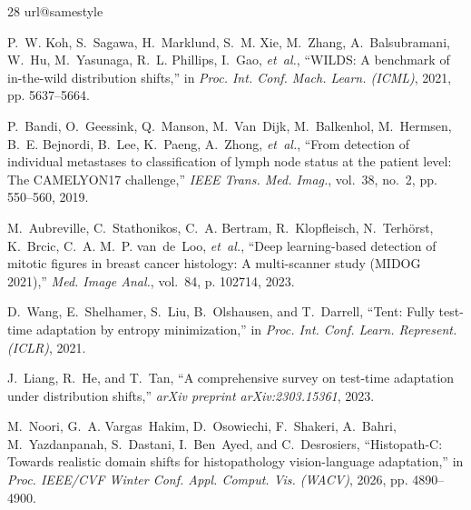 \documentclass[journal]{IEEEtran}
\begin{document}
\newpage
{}
\begin{thebibliography}{28}
\footnotesize
\setlength{\itemsep}{1.2pt plus 0.5pt minus 0.5pt}
\setlength{\parskip}{0pt}
\providecommand{\url}[1]{#1}
\csname url@samestyle\endcsname
\providecommand{\newblock}{\relax}
\providecommand{\bibinfo}[2]{#2}
\providecommand{\BIBentrySTDinterwordspacing}{\spaceskip=0pt\relax}
\providecommand{\BIBentryALTinterwordstretchfactor}{4}
\providecommand{\BIBentryALTinterwordspacing}{\spaceskip=\fontdimen2\font plus
\BIBentryALTinterwordstretchfactor\fontdimen3\font minus
  \fontdimen4\font\relax}
\providecommand{\BIBforeignlanguage}[2]{{
\expandafter\ifx\csname l@#1\endcsname\relax
\typeout{** WARNING: IEEEtran.bst: No hyphenation pattern has been}
\typeout{** loaded for the language #1'. Using the pattern for}
\typeout{** the default language instead.}
\else
\language=\csname l@#1\endcsname
\fi
#2}}
\providecommand{\BIBdecl}{\relax}
\BIBdecl

P.~W. Koh, S.~Sagawa, H.~Marklund, S.~M. Xie, M.~Zhang, A.~Balsubramani, W.~Hu, M.~Yasunaga, R.~L. Phillips, I.~Gao, \emph{et~al.}, ``{WILDS}: A benchmark of in-the-wild distribution shifts,'' in \emph{Proc. Int. Conf. Mach. Learn. (ICML)}, 2021, pp. 5637--5664.

P.~Bandi, O.~Geessink, Q.~Manson, M.~Van~Dijk, M.~Balkenhol, M.~Hermsen, B.~E. Bejnordi, B.~Lee, K.~Paeng, A.~Zhong, \emph{et~al.}, ``From detection of individual metastases to classification of lymph node status at the patient level: The {CAMELYON17} challenge,'' \emph{IEEE Trans. Med. Imag.}, vol.~38, no.~2, pp. 550--560, 2019.

M.~Aubreville, C.~Stathonikos, C.~A. Bertram, R.~Klopfleisch, N.~Terh{\"o}rst, K.~Brcic, C.~A. M.~P. van~de~Loo, \emph{et~al.}, ``Deep learning-based detection of mitotic figures in breast cancer histology: A multi-scanner study ({MIDOG} 2021),'' \emph{Med. Image Anal.}, vol.~84, p. 102714, 2023.

D.~Wang, E.~Shelhamer, S.~Liu, B.~Olshausen, and T.~Darrell, ``Tent: Fully test-time adaptation by entropy minimization,'' in \emph{Proc. Int. Conf. Learn. Represent. (ICLR)}, 2021.

J.~Liang, R.~He, and T.~Tan, ``A comprehensive survey on test-time adaptation under distribution shifts,'' \emph{arXiv preprint arXiv:2303.15361}, 2023.

M.~Noori, G.~A. Vargas~Hakim, D.~Osowiechi, F.~Shakeri, A.~Bahri, M.~Yazdanpanah, S.~Dastani, I.~Ben~Ayed, and C.~Desrosiers, ``{Histopath-C}: Towards realistic domain shifts for histopathology vision-language adaptation,'' in \emph{Proc. IEEE/CVF Winter Conf. Appl. Comput. Vis. (WACV)}, 2026, pp. 4890--4900.


\end{thebibliography}
\end{document}
